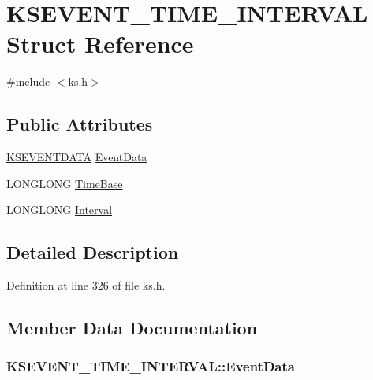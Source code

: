 \hypertarget{struct_k_s_e_v_e_n_t___t_i_m_e___i_n_t_e_r_v_a_l}{}\section{K\+S\+E\+V\+E\+N\+T\+\_\+\+T\+I\+M\+E\+\_\+\+I\+N\+T\+E\+R\+V\+AL Struct Reference}
\label{struct_k_s_e_v_e_n_t___t_i_m_e___i_n_t_e_r_v_a_l}


{\ttfamily \#include $<$ks.\+h$>$}

\subsection*{Public Attributes}
\begin{DoxyCompactItemize}
\item 
\hyperlink{struct_k_s_e_v_e_n_t_d_a_t_a}{K\+S\+E\+V\+E\+N\+T\+D\+A\+TA} \hyperlink{struct_k_s_e_v_e_n_t___t_i_m_e___i_n_t_e_r_v_a_l_aa62fc5e8dd4b34709ff9742f1f36f9ad}{Event\+Data}
\item 
L\+O\+N\+G\+L\+O\+NG \hyperlink{struct_k_s_e_v_e_n_t___t_i_m_e___i_n_t_e_r_v_a_l_a57ee4698d8bdb3705951590c038ac21b}{Time\+Base}
\item 
L\+O\+N\+G\+L\+O\+NG \hyperlink{struct_k_s_e_v_e_n_t___t_i_m_e___i_n_t_e_r_v_a_l_a6f91ab1972457e0dab0e3d1d5a4b22be}{Interval}
\end{DoxyCompactItemize}


\subsection{Detailed Description}


Definition at line 326 of file ks.\+h.



\subsection{Member Data Documentation}
\subsubsection[{\texorpdfstring{Event\+Data}{EventData}}]{ K\+S\+E\+V\+E\+N\+T\+\_\+\+T\+I\+M\+E\+\_\+\+I\+N\+T\+E\+R\+V\+A\+L\+::\+Event\+Data}\hypertarget{struct_k_s_e_v_e_n_t___t_i_m_e___i_n_t_e_r_v_a_l_aa62fc5e8dd4b34709ff9742f1f36f9ad}{}\label{struct_k_s_e_v_e_n_t___t_i_m_e___i_n_t_e_r_v_a_l_aa62fc5e8dd4b34709ff9742f1f36f9ad}


